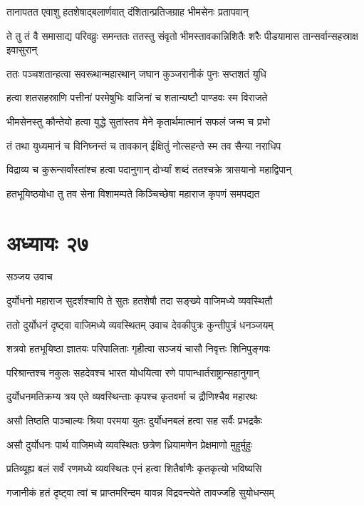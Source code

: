 \twolineshloka
{तानापतत एवाशु हतशेषाद्बलार्णवात्}
{दंशितान्प्रतिजग्राह भीमसेनः प्रतापवान्}


ते तु तं वै समासाद्य परिवव्रुः समन्ततः
\twolineshloka
{ततस्तु संवृतो भीमस्तावकान्निशितैः शरैः}
{पीडयामास तान्सर्वान्सहस्राक्ष इवासुरान्}


\twolineshloka
{ततः पञ्चशतान्हत्वा सवरूथान्महारथान्}
{जघान कुञ्जरानीकं पुनः सप्तशतं युधि}


\twolineshloka
{हत्वा शतसहस्राणि पत्तीनां परमेषुभिः}
{वाजिनां च शतान्यष्टौ पाण्डवः स्म विराजते}


\twolineshloka
{भीमसेनस्तु कौन्तेयो हत्वा युद्धे सुतांस्तव}
{मेने कृतार्थमात्मानं सफलं जन्म च प्रभो}


\twolineshloka
{तं तथा युध्यमानं च विनिघ्नन्तं च तावकान्}
{ईक्षितुं नोत्सहन्ते स्म तव सैन्या नराधिप}


\twolineshloka
{विद्राव्य च कुरून्सर्वांस्तांश्च हत्वा पदानुगान्}
{दोर्भ्यां शब्दं ततश्चक्रे त्रासयानो महाद्विपान्}


\twolineshloka
{हतभूयिष्ठयोधा तु तव सेना विशामम्पते}
{किञ्चिच्छेषा महाराज कृपणं समपद्यत}


\chapter{अध्यायः २७}
\twolineshloka
{सञ्जय उवाच}
{}


\twolineshloka
{दुर्योधनो महाराज सुदर्शश्चापि ते सुतः}
{हतशेषौ तदा सङ्ख्ये वाजिमध्ये व्यवस्थितौ}


\twolineshloka
{ततो दुर्योधनं दृष्ट्वा वाजिमध्ये व्यवस्थितम्}
{उवाच देवकीपुत्रः कुन्तीपुत्रं धनञ्जयम्}


\twolineshloka
{शत्रवो हतभूयिष्ठा ज्ञातयः परिपालिताः}
{गृहीत्वा सञ्जयं चासौ निवृत्तः शिनिपुङ्गवः}


\twolineshloka
{परिश्रान्तश्च नकुलः सहदेवश्च भारत}
{योधयित्वा रणे पापान्धार्तराष्ट्रान्सहानुगान्}


\twolineshloka
{दुर्योधनमतिक्रम्य त्रय एते व्यवस्थिन्ताः}
{कृपश्च कृतवर्मा च द्रौणिश्चैव महारथः}


\twolineshloka
{असौ तिष्ठति पाञ्चाल्यः श्रिया परमया युतः}
{दुर्योधनबलं हत्वा सह सर्वैः प्रभद्रकैः}


\twolineshloka
{असौ दुर्योधनः पार्थ वाजिमध्ये व्यवस्थितः}
{छत्रेण ध्रियामणेन प्रेक्षमाणो मुहुर्मुहुः}


\twolineshloka
{प्रतिव्यूह्य बलं सर्वं रणमध्ये व्यवस्थितः}
{एनं हत्वा शितैर्बाणैः कृतकृत्यो भविष्यसि}


\twolineshloka
{गजानीकं हतं दृष्ट्वा त्वां च प्राप्तमरिन्दम}
{यावन्न विद्रवन्त्येते तावज्जहि सुयोधन्सम्}


